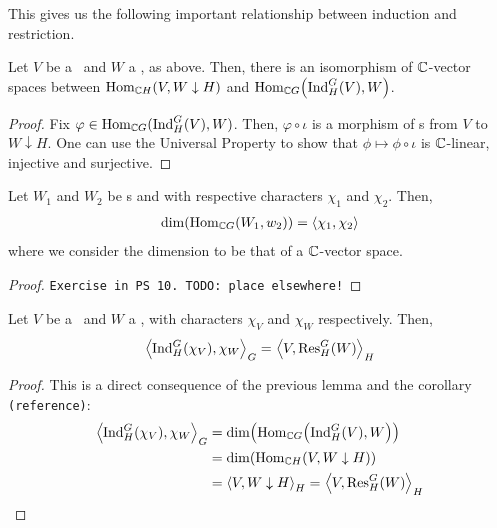 This gives us the following important relationship between induction and restriction.

\begin{corollary}
    Let $V$ be a \CHM\ and $W$ a \CHM, as above. Then, there is an isomorphism of $\mathbb{C}$-vector spaces between $\operatorname{Hom}_{\mathbb{C} H}\!\left( V, W \downarrow H \right)$ and $\operatorname{Hom}_{\mathbb{C} G}\!\left( \operatorname{Ind}_H^G(V), W \right)$.
\end{corollary}

\begin{proof}
    Fix $\varphi \in \operatorname{Hom}_{\mathbb{C} G}(\operatorname{Ind}_H^G(V), W)$. Then, $\varphi \circ \iota$ is a morphism of \CHM s from $V$ to $W \downarrow H$. One can use the Universal Property to show that $\phi \mapsto \phi \circ \iota$ is $\mathbb{C}$-linear, injective and surjective.
\end{proof}

\begin{lemma}
    Let $W_1$ and $W_2$ be \CGM s and with respective characters $\chi_1$ and $\chi_2$. Then,
    \begin{align*}
        \dim\!\left( \operatorname{Hom}_{\mathbb{C} G}\!\left( W_1, w_2 \right) \right) = \left\langle \chi_1, \chi_2 \right\rangle
    \end{align*}
    where we consider the dimension to be that of a $\mathbb{C}$-vector space.
\end{lemma}
\begin{proof}
    \verb|Exercise in PS 10. TODO: place elsewhere!|
\end{proof}

\begin{boxtheorem}
    Let $V$ be a \CHM\ and $W$ a \CGM, with characters $\chi_V$ and $\chi_W$ respectively. Then,
    \begin{align*}
        \left\langle \operatorname{Ind}_H^G(\chi_V), \chi_W \right\rangle_{G} = \left\langle V, \operatorname{Res}_H^G(W) \right\rangle_{H}
    \end{align*}
\end{boxtheorem}
\begin{proof}
    This is a direct consequence of the previous lemma and the corollary \verb|(reference)|:
    \begin{align*}
        \left\langle \operatorname{Ind}_H^G(\chi_V), \chi_W \right\rangle_{G} &= \dim\!\left( \operatorname{Hom}_{\mathbb{C} G}\!\left( \operatorname{Ind}_H^G(V), W \right) \right) \\
        &= \dim\!\left( \operatorname{Hom}_{\mathbb{C} H}\!\left( V, W \downarrow H \right) \right) \\
        &= \left\langle V, W \downarrow H \right\rangle_{H} = \left\langle V, \operatorname{Res}_H^G(W) \right\rangle_{H}
    \end{align*}
\end{proof}

